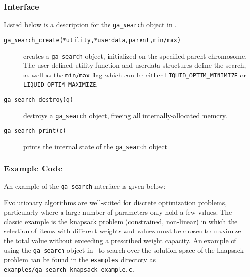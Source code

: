 \subsubsection{Interface}
\label{module:optim:ga_search:interface}
%
Listed below is a description for the {\tt ga\_search} object in
\liquid.
%
\begin{description}
\item[{\tt ga\_search\_create(*utility,*userdata,parent,min/max)}]
    creates a {\tt ga\_search} object, initialized on the specified
    parent chromosome.
    The user-defined utility function and userdata structures define the
    search, as well as the {\tt min/max} flag which can be either
    {\tt LIQUID\_OPTIM\_MINIMIZE} or
    {\tt LIQUID\_OPTIM\_MAXIMIZE}.
\item[{\tt ga\_search\_destroy(q)}]
    destroys a {\tt ga\_search} object, freeing all internally-allocated
    memory.
\item[{\tt ga\_search\_print(q)}]
    prints the internal state of the {\tt ga\_search} object
\end{description}
%

\subsubsection{Example Code}
\label{module:optim:ga_search:example}
An example of the {\tt ga\_search} interface is given below:
%

%
Evolutionary algorithms are well-suited for discrete optimization
problems, particularly where a large number of parameters only hold a
few values.
The classic example is the knapsack problem (constrained, non-linear)
in which the selection of items with different weights and values must
be chosen to maximize the total value without exceeding a prescribed
weight capacity.
An example of using the {\tt ga\_search} object in \liquid\ to search
over the solution space of the knapsack problem can be found in the
{\tt examples} directory as
{\tt examples/ga\_search\_knapsack\_example.c}.

